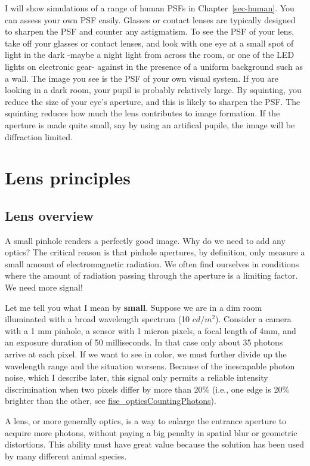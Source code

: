 \documentclass[
  letterpaper,
]{book}
\begin{document}
I will show simulations of a range of human PSFs in
Chapter~\ref{sec-human}. You can assess your own PSF easily. Glasses or
contact lenses are typically designed to sharpen the PSF and counter any
astigmatism. To see the PSF of your lens, take off your glasses or
contact lenses, and look with one eye at a small spot of light in the
dark -maybe a night light from across the room, or one of the LED lights
on electronic gear- against in the presence of a uniform background such
as a wall. The image you see is the PSF of your own visual system. If
you are looking in a dark room, your pupil is probably relatively large.
By squinting, you reduce the size of your eye's aperture, and this is
likely to sharpen the PSF. The squinting reduces how much the lens
contributes to image formation. If the aperture is made quite small, say
by using an artifical pupile, the image will be diffraction limited.

\chapter{Lens principles}\label{sec-optics-lenses}

\section{Lens overview}\label{lens-overview}

A small pinhole renders a perfectly good image. Why do we need to add
any optics? The critical reason is that pinhole apertures, by
definition, only measure a small amount of electromagnetic radiation. We
often find ourselves in conditions where the amount of radiation passing
through the aperture is a limiting factor. We need more signal!

Let me tell you what I mean by \textbf{small}. Suppose we are in a dim
room illuminated with a broad wavelength spectrum (10 \(cd/m^2\)).
Consider a camera with a 1 mm pinhole, a sensor with 1 micron pixels, a
focal length of 4mm, and an exposure duration of 50 milliseconds. In
that case only about 35 photons arrive at each pixel. If we want to see
in color, we must further divide up the wavelength range and the
situation worsens. Because of the inescapable photon noise, which I
describe later, this signal only permits a reliable intensity
discrimination when two pixels differ by more than 20\% (i.e., one edge
is 20\% brighter than the other, see
\href{../code/fise_opticsCountingPhotons.html}{fise\_opticsCountingPhotons}).

A lens, or more generally optics, is a way to enlarge the entrance
aperture to acquire more photons, without paying a big penalty in
spatial blur or geometric distortions. This ability must have great
value because the solution has been used by many different animal
species.
\end{document}
